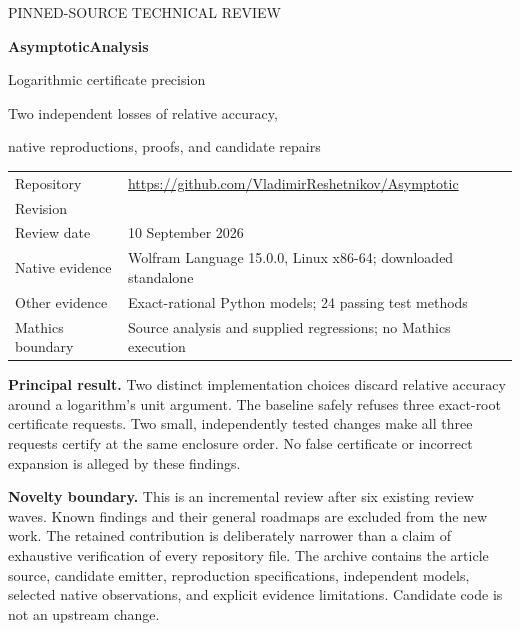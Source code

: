 \documentclass[11pt,letterpaper]{article}
\theoremstyle{remark}\newtheorem{remark}[proposition]{Remark}
\begin{document}
\begin{titlepage}
\vspace*{0.55in}
{\sffamily\color{muted}\large PINNED-SOURCE TECHNICAL REVIEW\par}
\vspace{0.35in}
{\sffamily\bfseries\color{ink}\Huge AsymptoticAnalysis\par}
\vspace{0.18in}
{\sffamily\color{ink}\LARGE Logarithmic certificate precision\par}
\vspace{0.22in}
{\large Two independent losses of relative accuracy,\par
native reproductions, proofs, and candidate repairs\par}
\vspace{0.55in}
{\renewcommand{\arraystretch}{1.22}
\begin{tabularx}{\textwidth}{@{}p{1.18in}Y@{}}
\toprule
Repository & \url{https://github.com/VladimirReshetnikov/Asymptotic} \\
Revision &  \\
Review date & 10 September 2026 \\
Native evidence & Wolfram Language 15.0.0, Linux x86-64; downloaded standalone \\
Other evidence & Exact-rational Python models; 24 passing test methods \\
Mathics boundary & Source analysis and supplied regressions; no Mathics execution \\
\bottomrule
\end{tabularx}}\par
\vspace{0.16in}
\textbf{Principal result.} Two distinct implementation choices discard relative
accuracy around a logarithm's unit argument. The baseline safely refuses three
exact-root certificate requests. Two small, independently tested changes make
all three requests certify at the same enclosure order. No false certificate
or incorrect expansion is alleged by these findings.

\textbf{Novelty boundary.} This is an incremental review after six existing
review waves. Known findings and their general roadmaps are excluded from the
new work. The retained contribution is deliberately narrower than a claim of
exhaustive verification of every repository file.
\vfill
{\small\color{muted}The archive contains the article source, candidate emitter,
reproduction specifications, independent models, selected native observations,
and explicit evidence limitations. Candidate code is not an upstream change.}
\end{titlepage}
\end{document}
